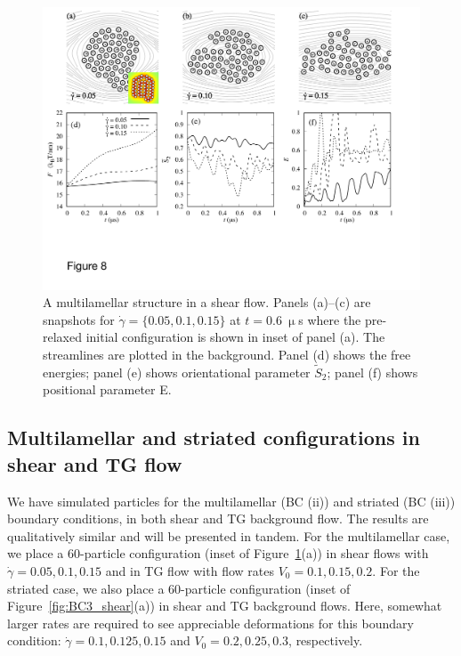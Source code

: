 \documentclass[prb,preprint,showpacs,preprintnumbers,amsmath,amssymb,longbibliography]{revtex4-1}
\begin{document}
\begin{figure}
  \begin{center}
\includegraphics[width=1.0\textwidth]{Figures/Figure8.pdf}
  \end{center}
  \vspace{-20pt}  
  \caption{\label{fig:BC2_shear} A multilamellar structure in a shear
  flow. Panels (a)--(c) are snapshots for $\dot \gamma = \{0.05, 0.1,
  0.15\}$ at $t=0.6\ \upmu$s where the pre-relaxed initial configuration
  is shown in inset of panel (a). The streamlines are plotted in the
  background. Panel (d) shows the free energies; panel (e) shows
  orientational parameter $\tilde{S}_2$; panel (f) shows positional
  parameter E.}
\end{figure}






\subsection{Multilamellar and striated configurations in shear and TG flow}
We have simulated particles for the multilamellar (BC (ii)) and striated
(BC (iii)) boundary conditions, in both shear and TG background flow.
The results are qualitatively similar and will be presented in tandem.
For the multilamellar case, we place a 60-particle configuration (inset
of Figure~\ref{fig:BC2_shear}(a)) in shear flows with $\dot\gamma=0.05,
0.1, 0.15$ and in TG flow with flow rates $V_0=0.1, 0.15, 0.2$. For the
striated case, we also place a 60-particle configuration (inset of
Figure~\ref{fig:BC3_shear}(a)) in shear and TG background flows. Here,
somewhat larger rates are required to see appreciable deformations for
this boundary condition: $\dot\gamma=0.1, 0.125, 0.15$ and $V_0=0.2,
0.25, 0.3$, respectively.
\end{document}
